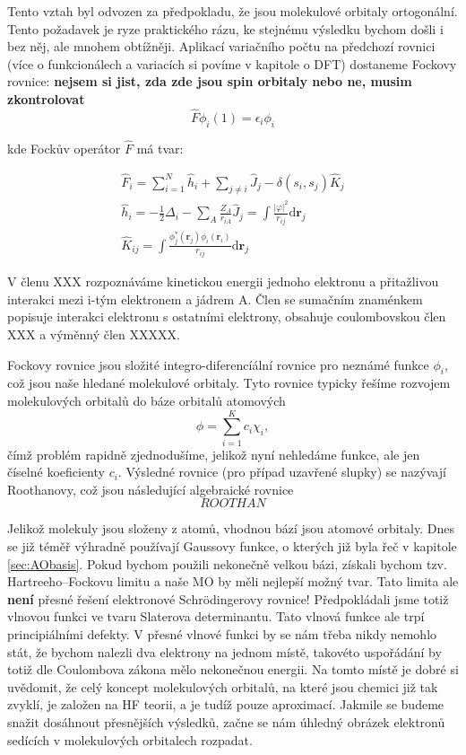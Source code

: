 Tento vztah byl odvozen za předpokladu, že jsou molekulové orbitaly ortogonální. Tento požadavek je ryze praktického rázu, ke stejnému výsledku bychom došli i bez něj, ale mnohem obtížněji. Aplikací variačního počtu na předchozí rovnici (více o funkcionálech a variacích si povíme v kapitole o DFT) dostaneme Fockovy rovnice: \textbf{nejsem si jist, zda zde jsou spin orbitaly nebo ne, musim zkontrolovat}
\begin{equation}
\hat{F}\phi_i(1) = \epsilon_i \phi_i 
\label{rov:abinitio:fockrov}  
\end{equation}

kde Fockův operátor $\hat{F}$ má tvar:

\begin{eqnarray}
\hat{F}_i = \sum_{i=1}^{N} \hat{h}_i+\sum_{j\neq i} \hat{J}_j - \delta(s_i,s_j) \hat{K}_j \\ \label{rov:abinitio:fockoper}
\hat{h}_i = -\frac{1}{2}\Delta_i - \sum_{A}\frac{Z_A}{r_{iA}}
\hat{J}_j=\int \frac{|\varphi |^2}{r_{ij}}\mathrm{d}\textbf{r}_j \\
\hat{K}_{ij} = \int \frac{\phi_j^*(\mathbf{r}_j)\phi_i(\mathbf{r}_i)}{r_{ij}}\mathrm{d}\textbf{r}_j
\end{eqnarray}

V členu XXX rozpoznáváme kinetickou energii jednoho elektronu a přitažlivou interakci mezi i-tým elektronem a jádrem A. Člen se sumačním znaménkem popisuje interakci elektronu s ostatními elektrony, obsahuje coulombovskou člen XXX a výměnný člen XXXXX.


Fockovy rovnice jsou složité integro-diferencíální rovnice pro neznámé funkce $\phi_i$,
což jsou naše hledané molekulové orbitaly.
Tyto rovnice typicky řešíme rozvojem molekulových orbitalů do báze orbitalů atomových
\begin{equation}
\phi=\sum_{i=1}^K c_i \chi_i ,
\end{equation}
čímž problém rapidně zjednodušíme, jelikož nyní nehledáme funkce, ale jen číselné koeficienty $c_i$.
Výsledné rovnice (pro případ uzavřené slupky) se nazývají Roothanovy, což jsou následující algebraické rovnice
\begin{equation}
ROOTHAN
\end{equation}


Jelikož molekuly jsou složeny z atomů, vhodnou bází jsou atomové orbitaly.
Dnes se již téměř výhradně používají Gaussovy funkce, o kterých již byla řeč v kapitole \ref{sec:AObasis}.
Pokud bychom použili nekonečně velkou bázi, získali bychom tzv. Hartreeho--Fockovu limitu a naše MO by měli nejlepší možný tvar. Tato limita ale \textbf{není} přesné řešení elektronové Schr\"{o}dingerovy rovnice!
Předpokládali jsme totiž vlnovou funkci ve tvaru Slaterova determinantu. Tato vlnová funkce ale trpí principiálními defekty. V přesné vlnové funkci by se nám třeba nikdy nemohlo stát, že bychom nalezli dva elektrony na jednom místě, takovéto uspořádání by totiž dle Coulombova zákona mělo nekonečnou energii.
Na tomto místě je dobré si uvědomit, že celý koncept molekulových orbitalů, na které jsou chemici již tak zvyklí, je založen na HF teorii, a je tudíž pouze aproximací. Jakmile se budeme snažit dosáhnout přesnějších výsledků, začne se nám úhledný obrázek elektronů sedících v molekulových orbitalech rozpadat.

